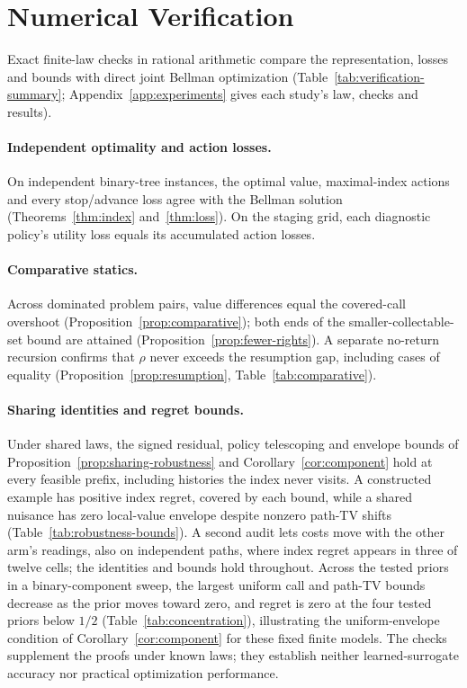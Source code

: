 \section{Numerical Verification}
\label{sec:validation}

Exact finite-law checks in rational arithmetic compare the representation, losses and bounds
with direct joint Bellman optimization (Table~\ref{tab:verification-summary};
Appendix~\ref{app:experiments} gives each study's law, checks and results).

\paragraph{Independent optimality and action losses.}
On independent binary-tree instances, the optimal value, maximal-index actions and every
stop/advance loss agree with the Bellman solution (Theorems~\ref{thm:index}
and~\ref{thm:loss}). On the staging grid, each diagnostic policy's utility loss equals its
accumulated action losses.

\paragraph{Comparative statics.}
Across dominated problem pairs, value differences equal the covered-call overshoot
(Proposition~\ref{prop:comparative}); both ends of the smaller-collectable-set bound are
attained (Proposition~\ref{prop:fewer-rights}). A separate no-return recursion confirms that
$\rho$ never exceeds the resumption gap, including cases of equality
(Proposition~\ref{prop:resumption}, Table~\ref{tab:comparative}).

\paragraph{Sharing identities and regret bounds.}
Under shared laws, the signed residual, policy telescoping and envelope bounds of
Proposition~\ref{prop:sharing-robustness} and Corollary~\ref{cor:component} hold at every
feasible prefix, including histories the index never visits. A constructed example has
positive index regret, covered by each bound, while a shared nuisance has zero local-value
envelope despite nonzero path-TV shifts (Table~\ref{tab:robustness-bounds}). A second audit
lets costs move with the other arm's readings, also on independent paths, where index regret
appears in three of twelve cells; the identities and bounds hold throughout. Across the
tested priors in a binary-component sweep, the largest uniform call and path-TV bounds
decrease as the prior moves toward zero, and regret is zero at the four tested priors below
$1/2$ (Table~\ref{tab:concentration}), illustrating the uniform-envelope condition of
Corollary~\ref{cor:component} for these fixed finite models. The checks supplement the
proofs under known laws; they establish neither learned-surrogate accuracy nor practical
optimization performance.
